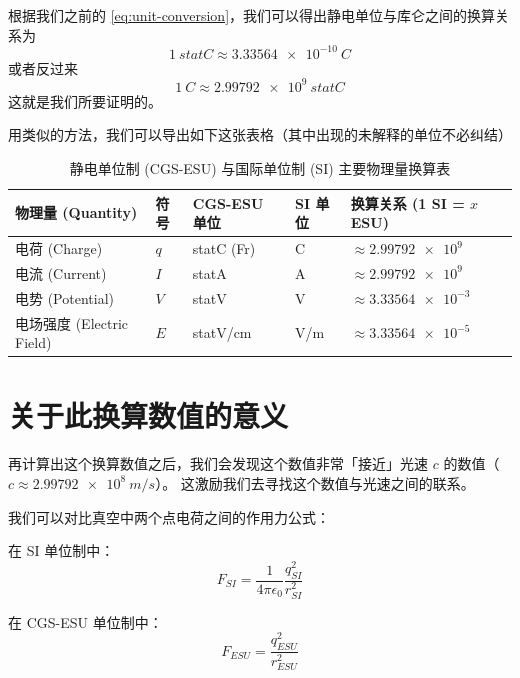 \documentclass[12pt,a4paper,UTF8,fontset=lxgw]{ctexart}
\begin{document}
根据我们之前的 \cref{eq:unit-conversion}，我们可以得出静电单位与库仑之间的换算关系为
\begin{equation}
    \qty{1}{statC} \approx \qty{3.33564e-10}{C}
\end{equation}
或者反过来
\begin{equation}
    \qty{1}{C} \approx \qty{2.99792e9}{statC}
\end{equation}
这就是我们所要证明的。

用类似的方法，我们可以导出如下这张表格（其中出现的未解释的单位不必纠结）
\begin{table}[htbp]
    \centering
    \caption{静电单位制 (CGS-ESU) 与国际单位制 (SI) 主要物理量换算表}
    \label{tab:unit-conversion}
    \begin{tabular}{lllll}
        \toprule
        物理量 (Quantity)        & 符号  & CGS-ESU 单位 & SI 单位 & 换算关系 (1 SI = $x$ ESU)        \\
        \midrule
        电荷 (Charge)           & $q$ & statC (Fr) & C     & $\approx \qty{2.99792e9}{}$  \\
        电流 (Current)          & $I$ & statA      & A     & $\approx \qty{2.99792e9}{}$  \\
        电势 (Potential)        & $V$ & statV      & V     & $\approx \qty{3.33564e-3}{}$ \\
        电场强度 (Electric Field) & $E$ & statV/cm   & V/m   & $\approx \qty{3.33564e-5}{}$ \\
        \bottomrule
    \end{tabular}
\end{table}

\section{关于此换算数值的意义}
再计算出这个换算数值之后，我们会发现这个数值非常「接近」光速 $c$ 的数值（$c \approx \qty{2.99792e8}{m/s}$）。
这激励我们去寻找这个数值与光速之间的联系。

我们可以对比真空中两个点电荷之间的作用力公式：

在 SI 单位制中：
\begin{equation}
    F_{SI} = \frac{1}{4\pi \epsilon_0} \frac{q_{SI}^2}{r_{SI}^2}
\end{equation}

在 CGS-ESU 单位制中：
\begin{equation}
    F_{ESU} = \frac{q_{ESU}^2}{r_{ESU}^2}
\end{equation}
\end{document}
